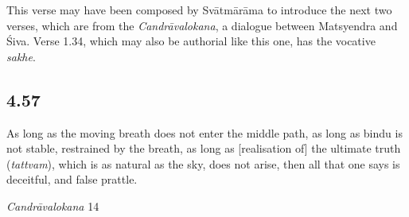 \begin{ekdosis}
\begin{philcomm}[hp04_056]
This verse may have been composed by Svātmārāma to introduce the next two verses, which are from the \emph{Candrāvalokana}, a dialogue between Matsyendra and Śiva. Verse 1.34, which may also be authorial like this one, has the vocative \emph{sakhe}.
\end{philcomm}

\subsection*{4.57}
\begin{translation}[hp04_057]
As long as the moving breath does not enter the middle path, as long as bindu is not stable, restrained by the breath, as long as [realisation of] the ultimate truth (\emph{tattvam}), which is as natural as the sky, does not arise, then all that one says is deceitful, and false prattle.
\end{translation}%

\begin{sources}[hp04_057]
\emph{Candrāvalokana} 14
\begin{versinnote}
\tl{\var{14b prāṇavātaprabandhaḥ~] 4345, prāṇaghātaprabuddhaḥ 75278, prāṇavāyuḥ prabuddhaḥ 7970, prāṇavātaprabuddhaḥ T00788}\\!}
\end{versinnote}
\end{sources}


\end{ekdosis}
